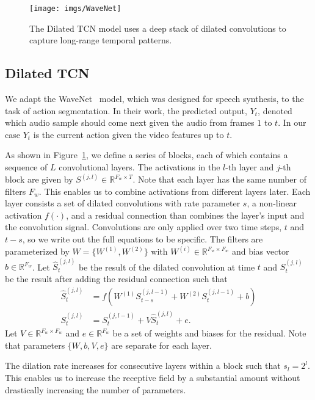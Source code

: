 \documentclass[10pt,twocolumn,letterpaper]{article}
\begin{document}
\begin{figure}
	\centering
	\texttt{[image: imgs/WaveNet]}		    
	\caption{The Dilated TCN model uses a deep stack of dilated convolutions to capture long-range temporal patterns. }
	\label{fig:WaveNet}
\end{figure}

\subsection{Dilated TCN}

We adapt the WaveNet~\cite{wavenet} model, which was designed for speech synthesis,  to the task of action segmentation. In their work, the predicted output, $Y_t$, denoted which audio sample should come next given the audio from frames $1$ to $t$.
In our case $Y_t$ is the current action given the video features up to $t$.


As shown in Figure~\ref{fig:WaveNet}, we define a series of blocks, each of which contains a sequence of $L$ convolutional layers. The activations in the $l$-th layer and $j$-th block are given by $S^{(j,l)} \in \mathbb{R}^{F_{w} \times T}$.
Note that each layer has the same number of filters $F_{w}$.
This enables us to combine  activations from different layers later. 
Each layer consists a set of dilated convolutions with rate parameter $s$, a non-linear activation $f(\cdot)$, and a residual connection than combines the layer's input and the convolution signal. 
Convolutions are only applied over two time steps, $t$ and $t-s$, so we write out the full equations to be specific.
The filters are parameterized by $W = \{W^{(1)}, W^{(2)}\}$ with $W^{(i)} \in \mathbb{R}^{ F_w \times F_w}$ and bias vector $b \in \mathbb{R}^{F_{w}}$. 
Let $\hat{S}^{(j,l)}_{t}$ be the result of the dilated convolution at time $t$ and $S^{(j,l)}_{t}$ be the result after adding the residual connection such that
\begin{align}\label{eqn:WaveNet}
\hat{S}^{(j,l)}_{t} &= f(W^{(1)} S^{(j,l-1)}_{t-s} + W^{(2)} S^{(j,l-1)}_{t} + b)\\
S^{(j,l)}_{t} &= S^{(j,l-1)}_{t} + V \hat{S}^{(j,l)}_{t} + e.
\end{align}
Let $V \in \mathbb{R}^{F_w \times F_w}$ and $e \in \mathbb{R}^{F_w}$ be a set of weights and biases for the residual. Note that parameters $\{W,b,V,e\}$ are separate for each layer.


The dilation rate increases for consecutive layers within a block such that $s_l=2^l$.
This enables us to increase the receptive field by a substantial amount without drastically increasing the number of parameters. 
\end{document}
